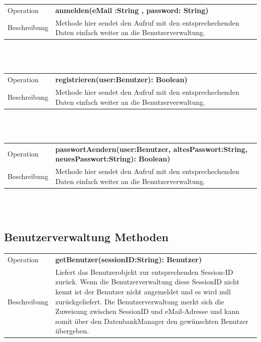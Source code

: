 \documentclass[12pt]{scrreprt}
\begin{document}
\begin{tabular}{|lp{12cm}|}
	\hline
	Operation &  \textbf{anmelden(eMail :String , password: String) }\\ 
	Beschreibung & Methode hier sendet den Aufruf mit den entsprechechenden Daten einfach weiter an die Benutzerverwaltung. \\ 
	\hline 
\end{tabular} \\\\
	

\begin{tabular}{|lp{12cm}|}
	\hline
	Operation &  \textbf{registrieren(user:Benutzer): Boolean) }\\ 
	Beschreibung & Methode hier sendet den Aufruf mit den entsprechechenden Daten einfach weiter an die Benutzerverwaltung. \\ 
	\hline 
	\end{tabular} \\\\

\begin{tabular}{|lp{12cm}|}
	\hline
	Operation &  \textbf{passwortAendern(user:Benutzer, altesPasswort:String, neuesPasswort:String): Boolean) }\\ 
	Beschreibung & Methode hier sendet den Aufruf mit den entsprechechenden Daten einfach weiter an die Benutzerverwaltung. \\ 
	\hline 
\end{tabular} \\\\


\subsection{Benutzerverwaltung  Methoden}

\begin{tabular}{|lp{12cm}|}
	\hline
	Operation &  \textbf{getBenutzer(sessionID:String): Benutzer) }\\ 
	Beschreibung & Liefert das Benutzerobjekt zur entsprechenden Session-ID zurück. Wenn die Benutzerverwaltung diese SessionID nicht kennt ist der Benutzer nicht angemeldet und es wird null zurückgeliefert. Die Benutzerverwaltung merkt sich die Zuweisung zwischen SessionID und eMail-Adresse und kann somit über den DatenbankManager den gewünschten Benutzer übergeben. \\ 
	\hline 
\end{tabular} \\\\
\end{document}
